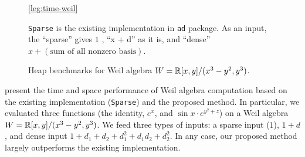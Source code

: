 \documentclass[rims-smooth-paper.tex]{subfiles}
\begin{document}
\begin{figure}[btp]
\begin{center}
  \ref*{leg:time-weil}

  \texttt{Sparse} is the existing implementation in \texttt{ad} package.
  As an input, the ``sparse'' gives $1$ , ``x + d'' as it is, and ``dense'' $x + (\text{sum of all nonzero basis})$.
  
  \caption{Heap benchmarks for Weil algebra $W = \mathbb{R}[x,y]/(x^3 - y^2, y^3)$. \label{fig:weil-heap-bench}}
  \end{center}
\end{figure}

 present the time and space performance of Weil algebra computation based on the existing implementation (\texttt{Sparse}) and the proposed method.
In particular, we evaluated three functions (the identity, $e^x$, and $\sin x \cdot e^{y^2 + z}$) on a Weil algebra $W = \mathbb{R}[x,y]/(x^3 - y^2, y^3)$.
We feed three types of inputs: a sparse input ($1$), $1 + d$, and dense input $1 + d_1 + d_2 + d_1^2 + d_1 d_2 + d_2^2$.
In any case, our proposed method largely outperforms the existing implementation.
\end{document}
